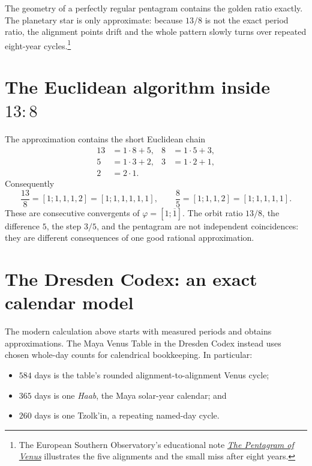 The geometry of a perfectly regular pentagram contains the golden ratio
exactly.  The planetary star is only approximate: because $13/8$ is not the
exact period ratio, the alignment points drift and the whole pattern slowly
turns over repeated eight-year cycles.\footnote{The European Southern
Observatory's educational note
\href{https://www.eso.org/public/outreach/eduoff/vt-2004/Education/edu1app5.html}{\emph{The
Pentagram of Venus}} illustrates the five alignments and the small miss after
eight years.}

\section{The Euclidean algorithm inside \texorpdfstring{$13:8$}{13:8}}

The approximation contains the short Euclidean chain
\[
\begin{aligned}
  13&=1\cdot8+5, & 8&=1\cdot5+3,\\
   5&=1\cdot3+2, & 3&=1\cdot2+1,\\
   2&=2\cdot1.
\end{aligned}
\]
Consequently
\[
  \frac{13}{8}=[1;1,1,1,2]=[1;1,1,1,1,1],
  \qquad
  \frac85=[1;1,1,2]=[1;1,1,1,1].
\]
These are consecutive convergents of
$\varphi=[1;\overline1]$.  The orbit ratio $13/8$, the difference $5$, the
step $3/5$, and the pentagram are not independent coincidences: they are
different consequences of one good rational approximation.

\section{The Dresden Codex: an exact calendar model}

The modern calculation above starts with measured periods and obtains
approximations.  The Maya Venus Table in the Dresden Codex instead uses chosen
whole-day counts for calendrical bookkeeping.  In particular:
\begin{itemize}
  \item $584$ days is the table's rounded alignment-to-alignment Venus cycle;
  \item $365$ days is one \emph{Haab}, the Maya solar-year calendar; and
  \item $260$ days is one Tzolk'in, a repeating named-day cycle.
\end{itemize}

